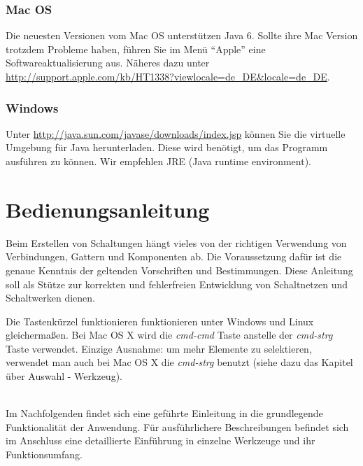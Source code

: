 \documentclass[12pt,a4paper]{scrartcl}
\newcommand{\fckSelectTool}{Auswahl - Werkzeug\xspace}
\begin{document}
\subsubsection{Mac OS}
Die neuesten Versionen vom Mac OS unterstützen Java 6. Sollte ihre Mac Version trotzdem Probleme haben, führen Sie im Menü ``Apple'' eine Softwareaktualisierung aus. Näheres dazu unter \url{http://support.apple.com/kb/HT1338?viewlocale=de\_DE&locale=de\_DE}.

\subsubsection{Windows}
Unter \url{http://java.sun.com/javase/downloads/index.jsp} können Sie die virtuelle Umgebung für Java herunterladen. Diese wird benötigt, um das Programm ausführen zu können. Wir empfehlen JRE (Java runtime environment).

%
%
\vspace{\baselineskip}
\section{Bedienungsanleitung}
Beim Erstellen von Schaltungen hängt vieles von der richtigen Verwendung von Verbindungen, Gattern und Komponenten ab. Die Voraussetzung dafür ist die genaue Kenntnis der geltenden Vorschriften und Bestimmungen. Diese Anleitung soll als Stütze zur korrekten und fehlerfreien Entwicklung von Schaltnetzen und Schaltwerken dienen.
\begin{info}
	Die Tastenkürzel funktionieren funktionieren unter Windows und Linux gleichermaßen. Bei Mac OS X wird die \textit{\gls{cmd-cmd}} Taste anstelle der \textit{\gls{cmd-strg}} Taste verwendet. Einzige Ausnahme: um mehr Elemente zu selektieren, verwendet man auch bei Mac OS X die \textit{\gls{cmd-strg}} benutzt (siehe dazu das Kapitel über \fckSelectTool).
\end{info} \\
Im Nachfolgenden findet sich eine geführte Einleitung in die grundlegende Funktionalität der Anwendung. Für ausführlichere Beschreibungen befindet sich im Anschluss eine detaillierte Einführung in einzelne Werkzeuge und ihr Funktionsumfang.

\newpage
\end{document}
